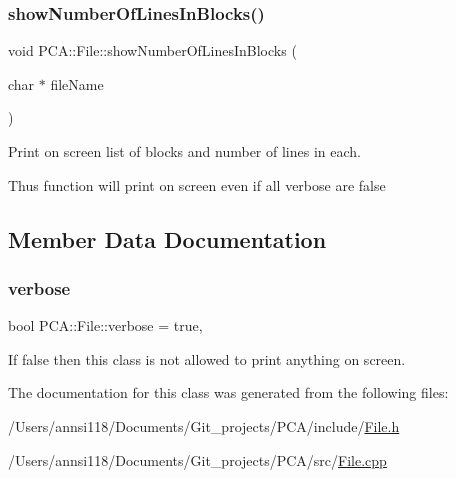 \subsubsection{\texorpdfstring{show\+Number\+Of\+Lines\+In\+Blocks()}{showNumberOfLinesInBlocks()}}
{\footnotesize\ttfamily void P\+C\+A\+::\+File\+::show\+Number\+Of\+Lines\+In\+Blocks (\begin{DoxyParamCaption}\item[{char $\ast$}]{file\+Name }\end{DoxyParamCaption})\hspace{0.3cm}{\ttfamily [static]}}



Print on screen list of blocks and number of lines in each. 

Thus function will print on screen even if all verbose are false 

\subsection{Member Data Documentation}
\hypertarget{class_p_c_a_1_1_file_a7d78765563f9be7e1ca260dcd3c65053}{}\label{class_p_c_a_1_1_file_a7d78765563f9be7e1ca260dcd3c65053} 
\subsubsection{\texorpdfstring{verbose}{verbose}}
{\footnotesize\ttfamily bool P\+C\+A\+::\+File\+::verbose = true\hspace{0.3cm}{\ttfamily [static]}, {\ttfamily [private]}}



If false then this class is not allowed to print anything on screen. 



The documentation for this class was generated from the following files\+:\begin{DoxyCompactItemize}
\item 
/\+Users/annsi118/\+Documents/\+Git\+\_\+projects/\+P\+C\+A/include/\hyperlink{_file_8h}{File.\+h}\item 
/\+Users/annsi118/\+Documents/\+Git\+\_\+projects/\+P\+C\+A/src/\hyperlink{_file_8cpp}{File.\+cpp}\end{DoxyCompactItemize}
